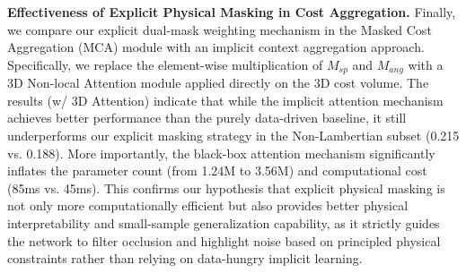 \textbf{Effectiveness of Explicit Physical Masking in Cost Aggregation.} 
Finally, we compare our explicit dual-mask weighting mechanism in the Masked Cost Aggregation (MCA) module with an implicit context aggregation approach. Specifically, we replace the element-wise multiplication of $M_{sp}$ and $M_{ang}$ with a 3D Non-local Attention module applied directly on the 3D cost volume. The results (w/ 3D Attention) indicate that while the implicit attention mechanism achieves better performance than the purely data-driven baseline, it still underperforms our explicit masking strategy in the Non-Lambertian subset (0.215 vs. 0.188). More importantly, the black-box attention mechanism significantly inflates the parameter count (from 1.24M to 3.56M) and computational cost (85ms vs. 45ms). This confirms our hypothesis that explicit physical masking is not only more computationally efficient but also provides better physical interpretability and small-sample generalization capability, as it strictly guides the network to filter occlusion and highlight noise based on principled physical constraints rather than relying on data-hungry implicit learning.
